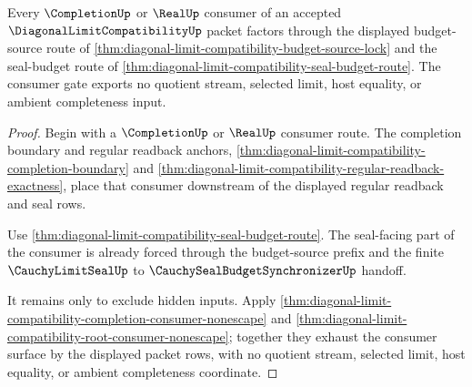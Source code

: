 \begin{theorem}
\label{thm:diagonal-limit-compatibility-completion-consumer-gate}
Every $\CompletionUp$ or $\RealUp$ consumer of an accepted $\DiagonalLimitCompatibilityUp$ packet factors through the displayed budget-source route of \autoref{thm:diagonal-limit-compatibility-budget-source-lock} and the seal-budget route of \autoref{thm:diagonal-limit-compatibility-seal-budget-route}. The consumer gate exports no quotient stream, selected limit, host equality, or ambient completeness input.
\end{theorem}
\begin{proof}
Begin with a $\CompletionUp$ or $\RealUp$ consumer route. The completion boundary and regular readback anchors, \autoref{thm:diagonal-limit-compatibility-completion-boundary} and \autoref{thm:diagonal-limit-compatibility-regular-readback-exactness}, place that consumer downstream of the displayed regular readback and seal rows.

Use \autoref{thm:diagonal-limit-compatibility-seal-budget-route}. The seal-facing part of the consumer is already forced through the budget-source prefix and the finite $\CauchyLimitSealUp$ to $\CauchySealBudgetSynchronizerUp$ handoff.

It remains only to exclude hidden inputs. Apply \autoref{thm:diagonal-limit-compatibility-completion-consumer-nonescape} and \autoref{thm:diagonal-limit-compatibility-root-consumer-nonescape}; together they exhaust the consumer surface by the displayed packet rows, with no quotient stream, selected limit, host equality, or ambient completeness coordinate.
\end{proof}


